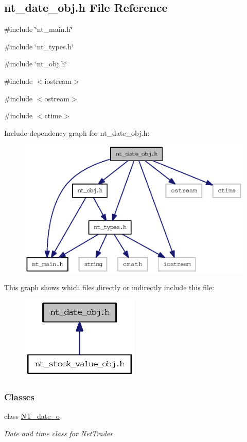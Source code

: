 \subsection{nt\_\-date\_\-obj.h File Reference}
\label{nt__date__obj_8h}
{\ttfamily \#include \char`\"{}nt\_\-main.h\char`\"{}}\par
{\ttfamily \#include \char`\"{}nt\_\-types.h\char`\"{}}\par
{\ttfamily \#include \char`\"{}nt\_\-obj.h\char`\"{}}\par
{\ttfamily \#include $<$iostream$>$}\par
{\ttfamily \#include $<$ostream$>$}\par
{\ttfamily \#include $<$ctime$>$}\par
Include dependency graph for nt\_\-date\_\-obj.h:
\nopagebreak
\begin{figure}[H]
\begin{center}
\leavevmode
\includegraphics[width=382pt]{nt__date__obj_8h__incl}
\end{center}
\end{figure}
This graph shows which files directly or indirectly include this file:
\nopagebreak
\begin{figure}[H]
\begin{center}
\leavevmode
\includegraphics[width=160pt]{nt__date__obj_8h__dep__incl}
\end{center}
\end{figure}
\subsubsection*{Classes}
\begin{DoxyCompactItemize}
\item 
class \hyperlink{class_n_t__date__o}{NT\_\-date\_\-o}
\begin{DoxyCompactList}\small\item\em Date and time class for NetTrader. \item\end{DoxyCompactList}\end{DoxyCompactItemize}
